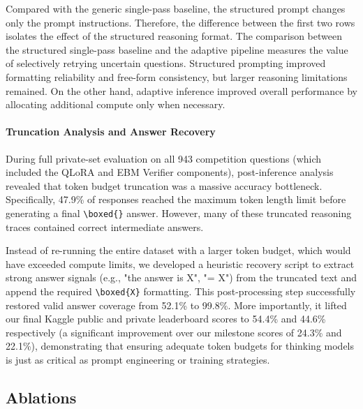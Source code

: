 \documentclass{article}
\begin{document}
Compared with the generic single-pass baseline, the structured prompt changes only the prompt instructions. Therefore, the difference between the first two rows isolates the effect of the structured reasoning format. The comparison between the structured single-pass baseline and the adaptive pipeline measures the value of selectively retrying uncertain questions. Structured prompting improved formatting reliability and free-form consistency, but larger reasoning limitations remained. On the other hand, adaptive inference improved overall performance by allocating additional compute only when necessary.

\paragraph{Truncation Analysis and Answer Recovery}
During full private-set evaluation on all 943 competition questions (which included the QLoRA and EBM Verifier components), post-inference analysis revealed that token budget truncation was a massive accuracy bottleneck. Specifically, 47.9\% of responses reached the maximum token length limit before generating a final \texttt{\textbackslash boxed\{\}} answer. However, many of these truncated reasoning traces contained correct intermediate answers.

Instead of re-running the entire dataset with a larger token budget, which would have exceeded compute limits, we developed a heuristic recovery script to extract strong answer signals (e.g., "the answer is X", "= X") from the truncated text and append the required \texttt{\textbackslash boxed\{X\}} formatting. This post-processing step successfully restored valid answer coverage from 52.1\% to 99.8\%. More importantly, it lifted our final Kaggle public and private leaderboard scores to 54.4\% and 44.6\% respectively (a significant improvement over our milestone scores of 24.3\% and 22.1\%), demonstrating that ensuring adequate token budgets for thinking models is just as critical as prompt engineering or training strategies.


\subsection{Ablations}
\label{sec:ablations}
\end{document}
